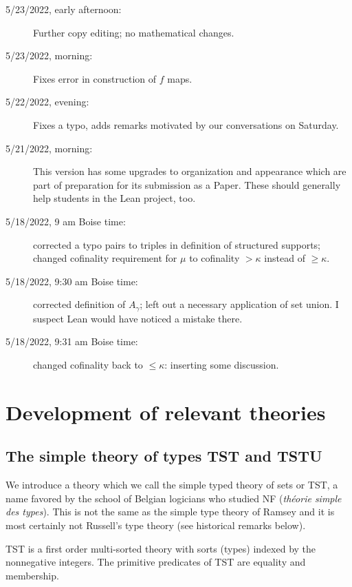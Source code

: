 \documentclass[112pt]{article}
\begin{document}
\begin{description}
\item[5/23/2022, early afternoon:]  Further copy editing;  no mathematical changes.

\item[5/23/2022, morning:]  Fixes error in construction of $f$ maps.

\item[5/22/2022, evening:]  Fixes a typo, adds remarks motivated by our conversations on Saturday.

\item[5/21/2022, morning:]  This version has some upgrades to organization and appearance which are part of preparation for its submission as a Paper.  These should generally help students in the Lean project, too.

\item[5/18/2022, 9 am Boise time:]  corrected a typo pairs to triples in definition of structured supports;  changed cofinality requirement for
$\mu$ to cofinality $>\kappa$ instead of $\geq \kappa$.

\item[5/18/2022, 9:30 am Boise time:]  corrected definition of $A_\gamma$;  left out a necessary application of set union.  I suspect Lean would have noticed a mistake there.

\item[5/18/2022, 9:31 am Boise time:]  changed cofinality back to $\leq \kappa$:  inserting some discussion.

\end{description}


\section{Development of relevant theories}

\subsection{The simple theory of types TST and TSTU}

We introduce a theory which we call the simple typed theory of sets or TST, a name favored by the school of Belgian logicians who studied NF ({\em th\'eorie simple des types}).  This is not the same as the simple type theory of Ramsey and it is most certainly not Russell's type theory  (see historical remarks below).

TST is a first order multi-sorted theory with sorts (types) indexed by the nonnegative integers.  The primitive predicates of TST are equality and membership.
\end{document}
